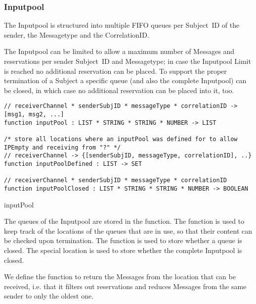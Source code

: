 \subsubsection{Inputpool}\label{sec:Inputpool}

The Inputpool is structured into multiple FIFO queues per Subject~ID of the sender, the Messagetype and the CorrelationID.

The Inputpool can be limited to allow a maximum number of Messages and
reservations per sender Subject~ID and Messagetype; in case the Inputpool Limit is
reached no additional reservation can be placed. To support the proper
termination of a Subject a specific queue (and also the complete Inputpool)
can be closed, in which case no additional reservation can be placed into it,
too.

\begin{listing}[H]
\begin{verbatim}
// receiverChannel * senderSubjID * messageType * correlationID -> [msg1, msg2, ...]
function inputPool : LIST * STRING * STRING * NUMBER -> LIST

/* store all locations where an inputPool was defined for to allow IPEmpty and receiving from "?" */
// receiverChannel -> {[senderSubjID, messageType, correlationID], ..}
function inputPoolDefined : LIST -> SET

// receiverChannel * senderSubjID * messageType * correlationID
function inputPoolClosed : LIST * STRING * STRING * NUMBER -> BOOLEAN
\end{verbatim}
\caption{inputPool}
\label{lst:shortasm:inputPool}
\end{listing}


The queues of the Inputpool are stored in the  function.
The function  is used to keep track of the
locations of the queues that are in use, so that their content can be checked
upon termination. The function  is used to store
whether a queue is closed. The special location
 is used to
store whether the complete Inputpool is closed.

We define the function  to return the
Messages from the location  that can be received, i.e. that it
filters out reservations and reduces Messages from the same sender to only
the oldest one.

